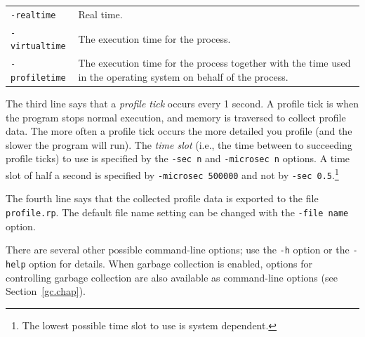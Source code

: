\documentclass[12pt]{book}
\begin{document}
\vspace{2mm}
{\def\arraystretch{1.4}
\begin{tabular}{lp{8cm}}
{\tt -realtime} & Real time.
  \index{realtime@\texttt{-realtime} option}%
  \index{timer!real} \\
{\tt -virtualtime} & The execution time for the process. %
  \index{virtualtime@\texttt{-virtualtime} option}%
  \index{timer!virtual} \\
{\tt -profiletime} & The execution time for the process together with the time used in
the operating system on behalf of the process. %
\index{profiletime@\texttt{-profiletime} option}%
  \index{timer!prof}
\end{tabular}}
\vspace{2mm}

The third line says that a
%
{\em profile tick\/} occurs every 1 second.  A profile tick is when
the program stops normal execution, and memory is traversed to collect
profile data. The more often a profile tick occurs the more detailed
you profile (and the slower the program will run). The
%
{\em time slot\/} (i.e., the time between to succeeding profile ticks) to use
is specified by the
%
\texttt{-sec n} and
%
\texttt{-microsec n} options. A time slot of half a second is
specified by \texttt{-microsec 500000} and not by \texttt{-sec
  0.5}.\footnote{The lowest possible time slot to use is system
  dependent.
}

The fourth line says that the collected profile data is exported to
the file \texttt{profile.rp}. The default file name setting can be
changed with the
%
\texttt{-file name} option.

There are several other possible command-line options; use the
\texttt{-h} option or the
%
\texttt{-help} option for details. When garbage collection is enabled,
options for controlling garbage collection are also available as
command-line options (see Section~\ref{gc.chap}).

\end{document}
